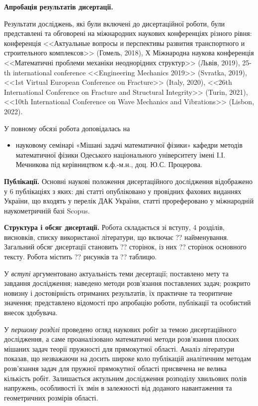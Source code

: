\textbf{Апробація результатів дисертації.}

Результати досліджень, які були включені до дисертаційної роботи, були представлені та обговорені на міжнародних наукових конференціях різного рівня:
конференція  <<Актуальные вопросы и перспективы развития транспортного и строительного комплексов>> (Гомель, 2018),
Х Міжнародна наукова конференція <<Математичні проблеми механіки неоднорідних структур>> (Львів, 2019),
25-th international conference <<Engineering Mechanics 2019>> (Svratka, 2019),
<<1st Virtual European Conference on Fracture>> (Italy, 2020),
<<26th International Conference on Fracture and Structural Integrity>> (Turin, 2021),
<<10th International Conference on Wave Mechanics and Vibrations>> (Lisbon, 2022).

У повному обсязі робота доповідалась на
\begin{itemize}
    \item науковому семінарі «Мішані задачі математичної фізики» кафедри методів
    математичної фізики Одеського національного університету імені І.І. Мечникова під керівництвом к.ф.-м.н., доц. Ю.С. Процерова.
\end{itemize}

\textbf{Публікації.}
Основні наукові положення дисертаційного дослідження відображено у 6 публікаціях з яких:
дві статті \cite{pozhylenkov_2,pozhylenkov_3} опубліковано у провідних фахових виданнях України, що входять у перелік ДАК України,
статті \cite{pozhylenkov_1,pozhylenkov_4,pozhylenkov_5,pozhylenkov_6} прореферовано у міжнародній наукометричній базі Scopus.

\textbf{Структура і обсяг дисертації.}
Робота складається зі вступу, 4 розділів, висновків, списку використаної літератури, що включає ?? найменування. Загальний обсяг дисертації становить ?? сторінок, із них ?? сторінок основного тексту. Робота містить ?? рисунків та ?? таблицю.

У \textit{вступі} аргументовано актуальність теми десертації; 
поставлено мету та завдання дослідження;
наведено методи розв'язання поставлених задач;
розкрито новизну і достовірність отриманих результатів, їх практичне та теоритичне значення;
представлено відомості про апробацію роботи, публікації та особистий внесок здобувача.

У \textit{першому розділі} проведено огляд наукових робіт за темою дисертаційного дослідження, а саме проаналізовано математичні методи розв'язання плоских мішаних задач теорії пружності для прямокутної області.
Аналіз літератури показав, що незважаючи на досить широке коло публікацій аналітичним методам розв'язання задач для пружної прямокутної області присвячена не велика кількість робіт.
Залишається актульним дослідження розподілу хвильових полів напружень, особливості їх змін в залежності від доданого навантаження та геометричних розмірів області.

